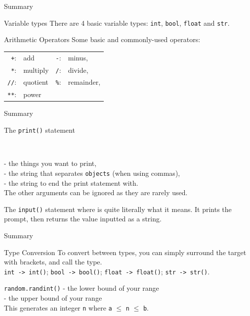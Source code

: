 \documentclass[dvipsnames, svgnames, x11names]{beamer}
\begin{document}
\begin{frame}[fragile]{Summary}
\begin{block}{Variable types}
There are 4 basic variable types: \texttt{int}, \texttt{bool}, \texttt{float} and \texttt{str}.
\end{block}
\begin{block}{Arithmetic Operators}
Some basic and commonly-used operators:\\
\centering
\begin{tabular}{rlrl}
\texttt{+}:& add & \texttt{-}:& minus,\\
\texttt{*}:& multiply & \texttt{/}:& divide,\\
\texttt{//}:& quotient & \texttt{\%}:& remainder,\\
\texttt{**}:& power &&
\end{tabular}
\end{block}
\end{frame}

\begin{frame}[fragile]{Summary}
\begin{block}{The \texttt{print()} statement}

\

 - the things you want to print,\\
 - the string that separates \texttt{objects} (when using commas),\\
 - the string to end the print statement with.\\
The other arguments can be ignored as they are rarely used.
\end{block}
\begin{block}{The \texttt{input()} statement}
where  is quite literally what it means. It prints the prompt, then returns the value inputted as a string.
\end{block}
\end{frame}

\begin{frame}[fragile]{Summary}
\begin{block}{Type Conversion}
To convert between types, you can simply surround the target with brackets, and call the type.\\
\texttt{int -> int()}; \texttt{bool -> bool()}; \texttt{float -> float()}; \texttt{str -> str()}.
\end{block}
\begin{block}{\texttt{random.randint()}}
 - the lower bound of your range\\[1pt]
 - the upper bound of your range\\
This generates an integer \texttt{n} where \texttt{a} $\leq$ \texttt{n} $\leq$ \texttt{b}.
\end{block}
\end{frame}
\end{document}
